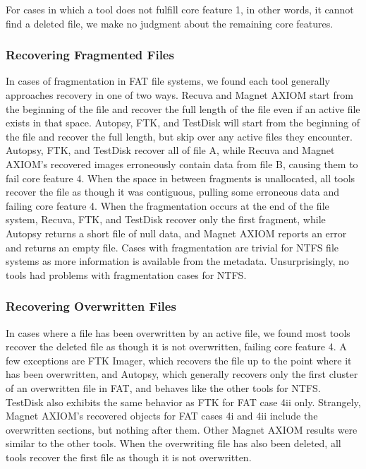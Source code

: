 For cases in which a tool does not fulfill core feature 1, in other words, it cannot find a deleted file, we make no judgment about the remaining core features.

\subsubsection{Recovering Fragmented Files}
In cases of fragmentation in FAT file systems, we found each tool generally approaches recovery in one of two ways. 
Recuva and Magnet AXIOM start from the beginning of the file and recover the full length of the file even if an active file exists in that space. 
Autopsy, FTK, and TestDisk will start from the beginning of the file and recover the full length, but skip over any active files they encounter.
Autopsy, FTK, and TestDisk recover all of file A, while Recuva and Magnet AXIOM's recovered images erroneously contain data from file B, causing them to fail core feature 4. 
When the space in between fragments is unallocated, all tools recover the file as though it was contiguous, pulling some erroneous data and failing core feature 4. 
When the fragmentation occurs at the end of the file system, Recuva, FTK, and TestDisk recover only the first fragment, while Autopsy returns a short file of null data, and Magnet AXIOM reports an error and returns an empty file.
Cases with fragmentation are trivial for NTFS file systems as more information is available from the metadata. 
Unsurprisingly, no tools had problems with fragmentation cases for NTFS.

\subsubsection{Recovering Overwritten Files}
In cases where a file has been overwritten by an active file, we found most tools recover the deleted file as though it is not overwritten, failing core feature 4. 
A few exceptions are FTK Imager, which recovers the file up to the point where it has been overwritten, and Autopsy, which generally recovers only the first cluster of an overwritten file in FAT, and behaves like the other tools for NTFS. 
TestDisk also exhibits the same behavior as FTK for FAT case 4ii only. 
Strangely, Magnet AXIOM's recovered objects for FAT cases 4i and 4ii include the overwritten sections, but nothing after them.
Other Magnet AXIOM results were similar to the other tools.
When the overwriting file has also been deleted, all tools recover the first file as though it is not overwritten.

